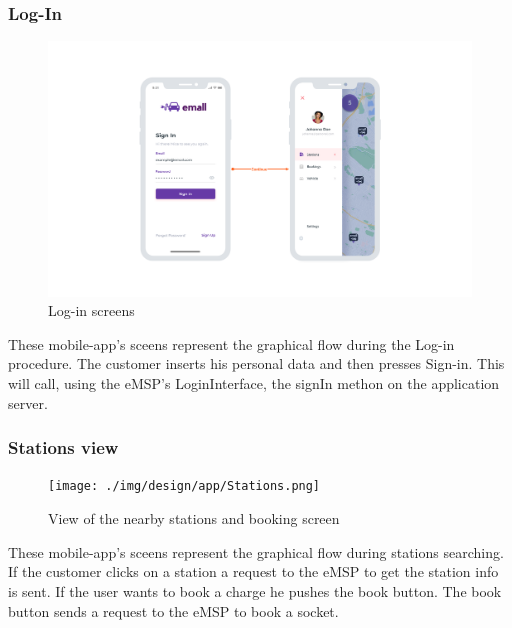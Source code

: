 \subsubsection{Log-In}
\begin{center}
    \begin{figure}[H]
        \includegraphics[width=\textwidth]{./img/design/app/Login.png}
        \caption{Log-in screens}
    \end{figure}
\end{center}
These mobile-app's sceens represent the graphical flow during the Log-in procedure. The customer inserts his personal data and then presses Sign-in. This will call, using the eMSP's LoginInterface, the signIn methon on the application server.

\subsubsection{Stations view}
\begin{center}
    \begin{figure}[H]
        \texttt{[image: ./img/design/app/Stations.png]}
        \caption{View of the nearby stations and booking screen}
    \end{figure}
\end{center}
These mobile-app's sceens represent the graphical flow during stations searching. If the customer clicks on a station a request to the eMSP to get the station info is sent. If the user wants to book a charge he pushes the book button. The book button sends a request to the eMSP to book a socket.


